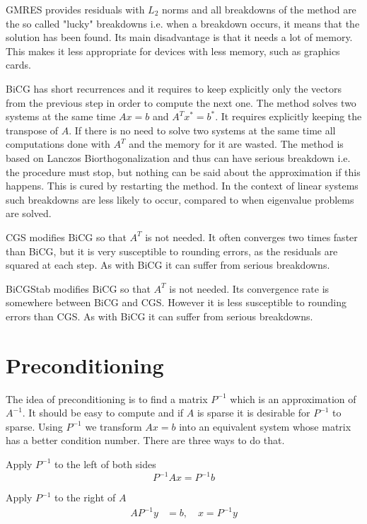 GMRES provides residuals with $L_2$ norms and all breakdowns of the method are the so called "lucky" breakdowns i.e. when a breakdown occurs, it means that the solution has been found. Its main disadvantage is that it needs a lot of memory. This makes it less appropriate for devices with less memory, such as graphics cards.

BiCG has short recurrences and it requires to keep explicitly only the vectors from the previous step in order to compute the next one. The method solves two systems at the same time $Ax = b$ and $A^Tx^* = b^*$. It requires explicitly keeping the transpose of $A$. If there is no need to solve two systems at the same time all computations done with $A^T$ and the memory for it are wasted. The method is based on Lanczos Biorthogonalization and thus can have serious breakdown i.e. the procedure must stop, but nothing can be said about the approximation if this happens. This is cured by restarting the method. In the context of linear systems such breakdowns are less likely to occur, compared to when eigenvalue problems are solved.

CGS modifies BiCG so that $A^T$ is not needed. It often converges two times faster than BiCG, but it is very susceptible to rounding errors, as the residuals are squared at each step. As with BiCG it can suffer from serious breakdowns.

BiCGStab modifies BiCG so that $A^T$ is not needed. Its convergence rate is somewhere between BiCG and CGS. However it is less susceptible to rounding errors than CGS. As with BiCG it can suffer from serious breakdowns.

\section{Preconditioning}
The idea of preconditioning is to find a matrix $P^{-1}$ which is an approximation of $A^{-1}$. It should be easy to compute and if $A$ is sparse it is desirable for $P^{-1}$ to sparse. Using $P^{-1}$ we transform $Ax=b$ into an equivalent system whose matrix has a better condition number. There are three ways to do that.

Apply $P^{-1}$ to the left of both sides
\begin{equation}\label{eq:precond_left}
	P^{-1}Ax = P^{-1}b
\end{equation}

Apply $P^{-1}$ to the right of $A$
\begin{align}
	AP^{-1}y &= b, \quad x = P^{-1}y
\end{align}

